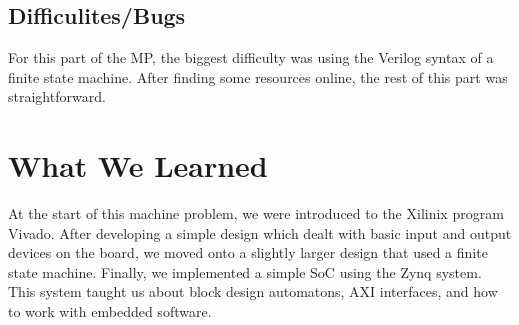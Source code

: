 \documentclass[letterpaper, 10 pt, conference]{IEEEconf}  %
\begin{document}
\subsection{Difficulites/Bugs}
For this part of the MP, the biggest difficulty was using the Verilog syntax of a finite state machine. After finding some resources online, the rest of this part was straightforward. 



\section{What We Learned}
At the start of this machine problem, we were introduced to the Xilinix program Vivado. After developing a simple design which dealt with basic input and output devices on the board, we moved onto a slightly larger design that used a finite state machine. Finally, we implemented a simple SoC using the Zynq system. This system taught us about block design automatons, AXI interfaces, and how to work with embedded software. 
\end{document}
